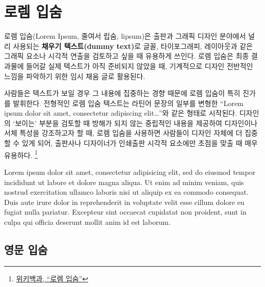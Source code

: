 \documentclass[
  letterpaper,
]{book}
\begin{document}
\hypertarget{lorem-ipsum}{%
\section{로렘 입숨}\label{lorem-ipsum}}

로렘 입숨(Lorem Ipsum, 줄여서 립숨, lipsum)은 출판과 그래픽 디자인
분야에서 널리 사용되는 \textbf{채우기 텍스트(dummy text)}로 글꼴,
타이포그래피, 레이아웃과 같은 그래픽 요소나 시각적 연출을 검토하고 싶을
때 유용하게 쓰인다. 로렘 입숨은 최종 결과물에 들어갈 실제 텍스트가 아직
준비되지 않았을 때, 기계적으로 디자인 전반적인 느낌을 파악하기 위한 임시
채움 글로 활용된다.

사람들은 텍스트가 보일 경우 그 내용에 집중하는 경향 때문에 로렘 입숨이
특히 진가를 발휘한다. 전형적인 로렘 입숨 텍스트는 라틴어 문장의 일부를
변형한 ``Lorem ipsum dolor sit amet, consectetur adipiscing
elit\ldots{}''와 같은 형태로 시작된다. 디자인의 `보이는' 부분을 검토할
때 방해가 되지 않는 중립적인 내용을 제공하여 디자인이나 서체 특성을
강조하고자 할 때, 로렘 입숨을 사용하면 사람들이 디자인 자체에 더 집중할
수 있게 되어, 출판사나 디자이너가 인쇄출판 시각적 요소에만 초점을 맞출
때 매우 유용하다. \footnote{\href{https://ko.wikipedia.org/wiki/\%EB\%A1\%9C\%EB\%A0\%98_\%EC\%9E\%85\%EC\%88\%A8}{위키백과,
  ``로렘 입숨''}}

\begin{tcolorbox}[enhanced jigsaw, opacityback=0, opacitybacktitle=0.6, colback=white, rightrule=.15mm, coltitle=black, colframe=quarto-callout-note-color-frame, colbacktitle=quarto-callout-note-color!10!white, bottomrule=.15mm, bottomtitle=1mm, breakable, title=\textcolor{quarto-callout-note-color}{\faInfo}\hspace{0.5em}{로렘 입숨 (영문) 사례}, titlerule=0mm, leftrule=.75mm, toptitle=1mm, left=2mm, arc=.35mm, toprule=.15mm]

Lorem ipsum dolor sit amet, consectetur adipisicing elit, sed do eiusmod
tempor incididunt ut labore et dolore magna aliqua. Ut enim ad minim
veniam, quis nostrud exercitation ullamco laboris nisi ut aliquip ex ea
commodo consequat. Duis aute irure dolor in reprehenderit in voluptate
velit esse cillum dolore eu fugiat nulla pariatur. Excepteur sint
occaecat cupidatat non proident, sunt in culpa qui officia deserunt
mollit anim id est laborum.

\end{tcolorbox}

\hypertarget{english-lipsum}{%
\subsection{영문 입숨}\label{english-lipsum}}
\end{document}
